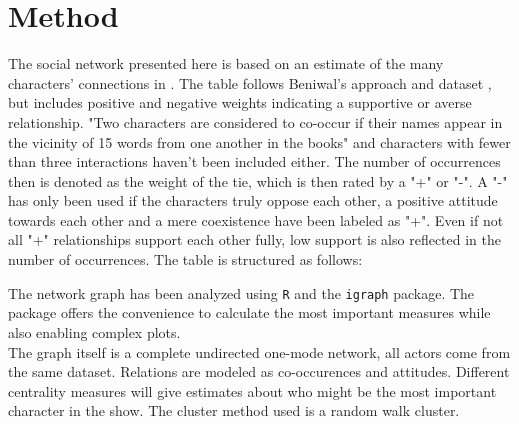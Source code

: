 \section{Method} \label{sec:method}
The social network presented here is based on an estimate of the many characters' connections in \got. The table follows Beniwal's approach and dataset \citep{beniwal_network_2018}, but includes positive and negative weights indicating a supportive or averse relationship. "Two characters are considered to co-occur if their names appear in the vicinity of 15 words from one another in the books" \citep{beniwal_network_2018} and characters with fewer than three interactions haven't been included either. The number of occurrences then is denoted as the weight of the tie, which is then rated by a "+" or "-". A "-" has only been used if the characters truly oppose each other, a positive attitude towards each other and a mere coexistence have been labeled as "+". Even if not all "+" relationships support each other fully, low support is also reflected in the number of occurrences. The table is structured as follows:



The network graph has been analyzed using \texttt{R} and the \texttt{igraph} package. The package offers the convenience to calculate the most important measures while also enabling complex plots.\\
The graph itself is a complete undirected one-mode network, all actors come from the same dataset.  Relations are modeled as co-occurences and attitudes. Different centrality measures will give estimates about who might be the most important character in the show. The cluster method used is a random walk cluster.

